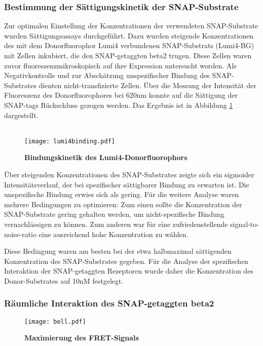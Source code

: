 \subsubsection{Bestimmung der Sättigungskinetik der SNAP-Substrate}
Zur optimalen Einstellung der Konzentrationen der verwendeten SNAP-Substrate wurden Sättigungsassays durchgeführt. Dazu wurden steigende Konzentrationen des mit dem Donorfluorophor Lumi4 verbundenen SNAP-Substrats (Lumi4-BG) mit Zellen inkubiert, die den SNAP-getaggten \gls{beta2} trugen. Diese Zellen waren zuvor fluoreszenzmikroskopisch auf ihre Expression untersucht worden. Als Negativkontrolle und zur Abschätzung unspezifischer Bindung des SNAP-Substrates dienten nicht-transfizierte Zellen. Über die Messung der Intensität der Fluoreszenz des Donorfluorophores bei 620nm konnte auf die Sättigung der SNAP-tags Rückschluss gezogen werden. Das Ergebnis ist in Abbildung \ref{fig:lumi4binding} dargestellt.
\\ \\
\begin{figure}[htbp]
	\centering
    \texttt{[image: lumi4binding.pdf]}
    \caption{\textbf{Bindungskinetik des Lumi4-Donorfluorophors}}
    \label{fig:lumi4binding}
\end{figure}
Über steigenden Konzentrationen des SNAP-Substrates zeigte sich ein sigmoider Intensitätsverlauf, der bei spezifischer sättigbarer Bindung zu erwarten ist. Die unspezifische Bindung erwies sich als gering. Für die weitere Analyse waren mehrere Bedingungen zu optimieren: Zum einen sollte die Konzentration der SNAP-Substrate gering gehalten werden, um nicht-spezifische Bindung vernachlässigen zu können. Zum anderen war für eine zufriedenstellende signal-to-noise-ratio eine ausreichend hohe Konzentration zu wählen.

Diese Bedingung waren am besten bei der etwa halbmaximal sättigenden Konzentration des SNAP-Substrates gegeben. Für die Analyse der spezifischen Interaktion der SNAP-getaggten Rezeptoren wurde daher die Konzentration des Donor-Substrates auf 10\si{\nano M} festgelegt.

\subsubsection{Räumliche Interaktion des SNAP-getaggten \gls{beta2}}
\begin{figure}[htbp]
	\centering
    \texttt{[image: bell.pdf]}
    \caption{\textbf{Maximierung des FRET-Signals}}
    \label{fig:bell}
\end{figure}
    
